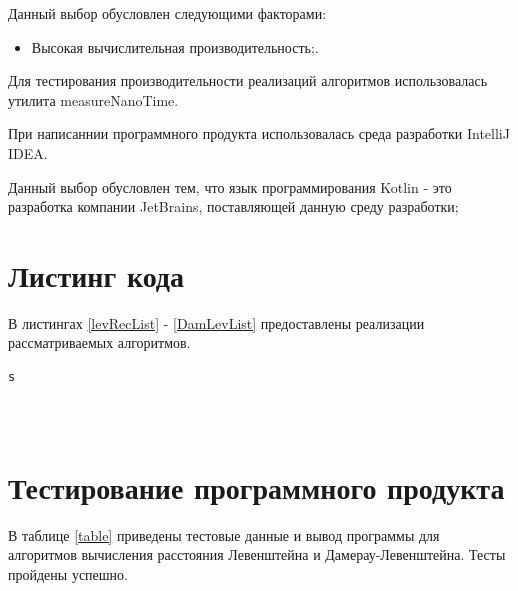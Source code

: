 \documentclass[12pt]{report}
\begin{document}
Данный выбор обусловлен следующими факторами:
\begin{itemize}
\item Высокая вычислительная производительность;.
\end{itemize}

Для тестирования производительности реализаций алгоритмов использовалась утилита measureNanoTime.

При написаннии программного продукта использовалась среда разработки IntelliJ IDEA.

Данный выбор обусловлен тем, что язык программирования Kotlin - это разработка компании JetBrains, поставляющей данную среду разработки;

\section{Листинг кода}
В листингах \ref{levRecList} - \ref{DamLevList} предоставлены реализации рассматриваемых алгоритмов.
\begin{lstlisting}[caption=Функция реализации рекурсивного алгоритма Левенштейна,
label={levRecList}]
s
\end{lstlisting}

\begin{lstlisting}[caption=Функция реализации рекурсивного алгоритма Левенштейна с использованием матрицы расстояний,
label={levRecMatList}]

\end{lstlisting}

\begin{lstlisting}[caption=Функция реализации итеративного алгоритма Левенштейна,
label={levIterList}]

\end{lstlisting}

\begin{lstlisting}[caption=Функция реализации алгоритма Дамерау-Левенштейна,
label={DamLevList}]

\end{lstlisting}

\section{Тестирование программного продукта}
В таблице \ref{table} приведены тестовые данные и вывод программы для алгоритмов вычисления расстояния Левенштейна и Дамерау-Левенштейна. Тесты пройдены успешно.
\end{document}

